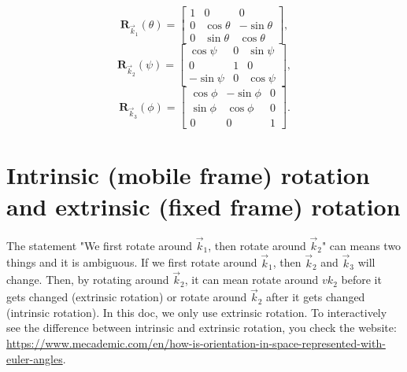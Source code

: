 \documentclass{article}
\newcommand{\vk}{\vec k}
\begin{document}
\begin{equation*}
    \mathbf{R}_{\vec{k}_1} (\theta) = 
    \begin{bmatrix}  
  1 & 0 & 0 \\  
  0 & \cos{\theta} & -\sin{\theta} \\
  0 & \sin{\theta} & \cos{\theta}   
\end{bmatrix} ,
\label{eq:pitch}
\end{equation*} 
\begin{equation*}
    \mathbf{R}_{\vec{k}_2} (\psi) = \begin{bmatrix}  
  \cos{\psi} & 0 & \sin{\psi} \\  
  0 & 1 & 0 \\
  -\sin{\psi} & 0 & \cos{\psi}   
\end{bmatrix}, 
\end{equation*}
\begin{equation*}
    \mathbf{R}_{\vec{k}_3} (\phi) = \begin{bmatrix} 
  \cos{\phi} & -\sin{\phi} & 0 \\
  \sin{\phi} & \cos{\phi} & 0 \\
  0 & 0 & 1
\end{bmatrix}. 
\end{equation*}

\section{Intrinsic (mobile frame) rotation and extrinsic (fixed frame) rotation}
The statement "We first rotate around $\vk_1$, then rotate around $\vk_2$" can means two things and it is ambiguous. 
If we first rotate around $\vk_1$, then $\vk_2$ and $\vk_3$ will change. Then, by rotating around $\vk_2$, it can mean rotate around $vk_2$ before it gets changed (extrinsic rotation) or rotate around $\vk_2$ after it gets changed (intrinsic rotation). In this doc, we only use extrinsic rotation. To interactively see the difference between intrinsic and extrinsic rotation, you check the website: \url{https://www.mecademic.com/en/how-is-orientation-in-space-represented-with-euler-angles}.
\end{document}
